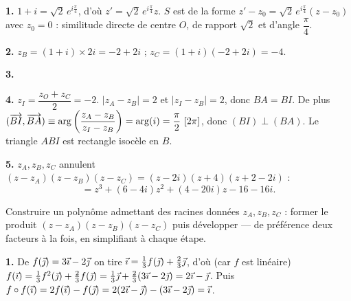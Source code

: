 \documentclass[11pt]{article}
\begin{document}

\textbf{1.} $1 + i = \sqrt{2}\,e^{i\frac{\pi}{4}}$, d'où $z' = \sqrt{2}\,e^{i\frac{\pi}{4}}z$. $S$ est de la forme $z' - z_0 = \sqrt{2}\,e^{i\frac{\pi}{4}}(z - z_0)$ avec $z_0 = 0$ : similitude directe de centre $O$, de rapport $\sqrt{2}$ et d'angle $\dfrac{\pi}{4}$.

\textbf{2.} $z_B = (1+i)\times 2i = -2 + 2i$ ; \quad $z_C = (1+i)(-2 + 2i) = -4$.

\textbf{3.}
\begin{center}
\end{center}

\textbf{4.} $z_I = \dfrac{z_O + z_C}{2} = -2$. $|z_A - z_B| = 2$ et $|z_I - z_B| = 2$, donc $BA = BI$. De plus $(\overrightarrow{BI}, \overrightarrow{BA}) \equiv \arg\left(\dfrac{z_A - z_B}{z_I - z_B}\right) = \arg(i) = \dfrac{\pi}{2}\ [2\pi]$, donc $(BI) \perp (BA)$. Le triangle $ABI$ est rectangle isocèle en $B$.

\textbf{5.} $z_A, z_B, z_C$ annulent $(z - z_A)(z - z_B)(z - z_C) = (z - 2i)(z + 4)(z + 2 - 2i)$ :
\[ = z^3 + (6 - 4i)z^2 + (4 - 20i)z - 16 - 16i. \]

\begin{methode}
Construire un polynôme admettant des racines données $z_A, z_B, z_C$ :
former le produit $(z - z_A)(z - z_B)(z - z_C)$ puis développer — de
préférence deux facteurs à la fois, en simplifiant à chaque étape.
\end{methode}

\textbf{1.} De $f(\vec{\jmath}) = 3\vec{\imath} - 2\vec{\jmath}$ on tire $\vec{\imath} = \tfrac{1}{3}f(\vec{\jmath}) + \tfrac{2}{3}\vec{\jmath}$, d'où (car $f$ est linéaire) $f(\vec{\imath}) = \tfrac{1}{3}f^2(\vec{\jmath}) + \tfrac{2}{3}f(\vec{\jmath}) = \tfrac{1}{3}\vec{\jmath} + \tfrac{2}{3}(3\vec{\imath} - 2\vec{\jmath}) = 2\vec{\imath} - \vec{\jmath}$. Puis $f\circ f(\vec{\imath}) = 2f(\vec{\imath}) - f(\vec{\jmath}) = 2(2\vec{\imath} - \vec{\jmath}) - (3\vec{\imath} - 2\vec{\jmath}) = \vec{\imath}$.
\end{document}
